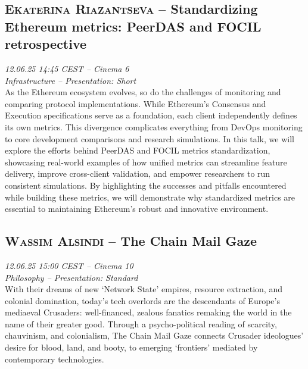 \subsection {\textsc{Ekaterina Riazantseva}  -- Standardizing Ethereum metrics: PeerDAS and FOCIL retrospective} \noindent \textit {12.06.25 14:45 CEST -- Cinema 6\\ Infrastructure -- Presentation: Short}\\[1em] As the Ethereum ecosystem evolves, so do the challenges of monitoring and comparing protocol implementations. While Ethereum’s Consensus and Execution specifications serve as a foundation, each client independently defines its own metrics. This divergence complicates everything from DevOps monitoring to core development comparisons and research simulations. In this talk, we will explore the efforts behind PeerDAS and FOCIL metrics standardization, showcasing real-world examples of how unified metrics can streamline feature delivery, improve cross-client validation, and empower researchers to run consistent simulations. By highlighting the successes and pitfalls encountered while building these metrics, we will demonstrate why standardized metrics are essential to maintaining Ethereum’s robust and innovative environment.

\clearpage
\subsection {\textsc{Wassim Alsindi}  -- The Chain Mail Gaze} \noindent \textit {12.06.25 15:00 CEST -- Cinema 10\\ Philosophy -- Presentation: Standard}\\[1em] With their dreams of new ‘Network State’ empires, resource extraction, and colonial domination, today’s tech overlords are the descendants of Europe’s mediaeval Crusaders: well-financed, zealous fanatics remaking the world in the name of their greater good. Through a psycho-political reading of scarcity, chauvinism, and colonialism, The Chain Mail Gaze connects Crusader ideologues’ desire for blood, land, and booty, to emerging ‘frontiers’ mediated by contemporary technologies.

\clearpage
